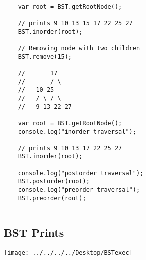 \begin{lstlisting}
    
    var root = BST.getRootNode();
    
    // prints 9 10 13 15 17 22 25 27
    BST.inorder(root);
    
    // Removing node with two children
    BST.remove(15);
    
    //		 17
    //		 / \
    //	 10 25
    //	 / \ / \
    //	 9 13 22 27
    
    var root = BST.getRootNode();
    console.log("inorder traversal");
    
    // prints 9 10 13 17 22 25 27
    BST.inorder(root);
    
    console.log("postorder traversal");
    BST.postorder(root);
    console.log("preorder traversal");
    BST.preorder(root);
    
    \end{lstlisting}
    
    \subsection{BST Prints}
    
    
    \texttt{[image: ../../../../Desktop/BSTexec]}
    


